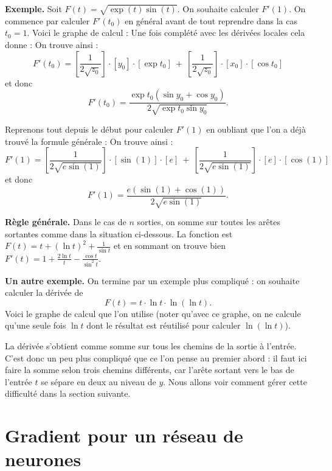 \documentclass[11pt,class=report,crop=false]{standalone}
\begin{document}
\bigskip
\textbf{Exemple.}
Soit $F(t) = \sqrt{\exp(t)\sin(t)}$. On souhaite calculer $F'(1)$. On commence par calculer $F'(t_0)$ en général avant de tout reprendre dans la cas $t_0=1$.
Voici le graphe de calcul :
Une fois complété avec les dérivées locales cela donne :
On trouve ainsi :
$$F'(t_0) = \left[\frac{1}{2\sqrt{z_0}}\right]\cdot[y_0]\cdot[\exp t_0]
\  + \  \left[\frac{1}{2\sqrt{z_0}}\right]\cdot[x_0]\cdot[\cos t_0]
$$
et donc 
$$F'(t_0) = \frac{\exp t_0 (\sin y_0 + \cos y_0)}{2\sqrt{\exp t_0 \sin y_0}}.$$

Reprenons tout depuis le début pour calculer $F'(1)$ en oubliant que l'on a déjà trouvé la formule générale :
On trouve ainsi :
$$F'(1) = \left[\frac{1}{2\sqrt{e\sin(1)}}\right]\cdot[\sin(1)]\cdot[e]
\  + \  \left[\frac{1}{2\sqrt{e\sin(1)}}\right]\cdot[e]\cdot[\cos(1)]
$$
et donc 
$$F'(1) = \frac{e (\sin(1)+\cos(1))}{2\sqrt{e\sin(1)}}.$$


\bigskip
\textbf{Règle générale.}
Dans le cas de $n$ sorties, on somme sur toutes les arêtes sortantes comme dans la situation ci-dessous.
La fonction est $F(t) = t + (\ln t)^2 + \frac{1}{\sin t}$ et en sommant on trouve bien $F'(t) = 1 + \frac{2\ln t}{t} - \frac{\cos t}{\sin^2 t}$.


\bigskip
\textbf{Un autre exemple.}
On termine par un exemple plus compliqué : on souhaite calculer la dérivée de 
$$F(t) = t \cdot \ln t \cdot \ln(\ln t).$$
Voici le graphe de calcul que l'on utilise (noter qu'avec ce graphe, on ne calcule qu'une seule fois $\ln t$ dont le résultat est réutilisé pour calculer $\ln(\ln t)$).


La dérivée s'obtient comme somme sur tous les chemins de la sortie à l'entrée.
C'est donc un peu plus compliqué que ce l'on pense au premier abord : il faut ici faire la somme selon trois chemins différents, car l'arête sortant vers le bas de l'entrée $t$ se sépare en deux au niveau de $y$. Nous allons voir comment gérer cette difficulté dans la section suivante.


\section{Gradient pour un réseau de neurones}
\end{document}

